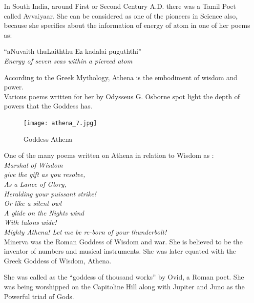 \documentclass[a4paper,10pt]{article}
\begin{document}
In South India, around First or Second Century A.D. there was a Tamil Poet called Avvaiyaar. She can be considered as one of the pioneers in Science also, because she specifies about the information of energy of atom in one of her poems as: \\
\begin{center}
``aNuvaith thuLaiththu Ez kadalai puguththi'' \\
\textit{Energy of seven seas within a pierced atom}\\
\end{center}
\newblock
According to the Greek Mythology, Athena is the embodiment of wisdom and power.\\
Various poems written for her by Odysseus G. Osborne spot light the depth of powers that the Goddess has.\\
\begin{center}
\begin{figure}[h]
\centering
 \texttt{[image: athena\_7.jpg]}
 \caption{Goddess Athena}
\end{figure}
\end{center}

One of the many poems written on Athena in relation to Wisdom as \cite{athena}:\\


\textit{Marshal of Wisdom}\\
\textit{give the gift as you resolve,}\\
\textit{As a Lance of Glory,}\\
\textit{Heralding your puissant strike!}\\
\textit{Or like a silent owl}\\
\textit{A glide on the Nights wind}\\
\textit{With talons wide!}\\
\textit{Mighty Athena! Let me be re-born of your thunderbolt!}\\

\newblock
Minerva was the Roman Goddess of Wisdom and war. She is believed to be the inventor of numbers and musical instruments. She was later equated with the Greek Goddess of Wisdom, Athena.

She was called as the “goddess of thousand works” by Ovid, a Roman poet. She was being worshipped on the Capitoline Hill along with Jupiter and Juno as the Powerful triad of Gods.
\end{document}
